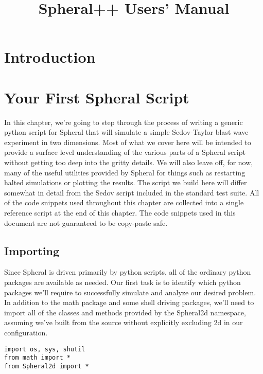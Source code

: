 \documentclass[11pt]{memoir}
\title{Spheral++ Users' Manual}
\begin{document}
\maketitle

\chapter{Introduction}

\chapter{Your First Spheral Script}

\lstset{basicstyle=\small,style=myCustomPythonStyle}

In this chapter, we're going to step through the process of writing a generic python script for Spheral that will simulate a simple Sedov-Taylor blast wave experiment in two dimensions. Most of what we cover here will be intended to provide a surface level understanding of the various parts of a Spheral script without getting too deep into the gritty details. We will also leave off, for now, many of the useful utilities provided by Spheral for things such as restarting halted simulations or plotting the results. The script we build here will differ somewhat in detail from the Sedov script included in the standard test suite. All of the code snippets used throughout this chapter are collected into a single reference script at the end of this chapter. The code snippets used in this document are not guaranteed to be copy-paste safe.

\section{Importing}

Since Spheral is driven primarily by python scripts, all of the ordinary python packages are available as needed. Our first task is to identify which python packages we'll require to successfully simulate and analyze our desired problem. In addition to the math package and some shell driving packages, we'll need to import all of the classes and methods provided by the Spheral2d namespace, assuming we've built from the source without explicitly excluding 2d in our configuration.

\begin{lstlisting}[firstnumber=last]
import os, sys, shutil
from math import *
from Spheral2d import *
\end{lstlisting}
\end{document}
